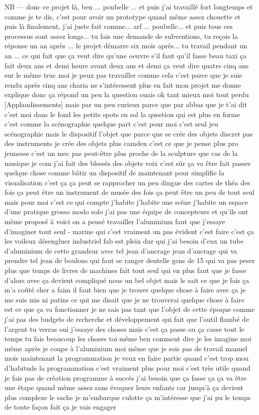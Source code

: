 NB — donc ce projet là, ben ... poubelle ... et puis j'ai travaillé fort longtemps et comme je te dis, c'est pour avoir un prototype quand même assez chouette et puis là finalement, j'ai juste fait comme... arf ... poubelle... et puis tous ces processus sont assez longs... tu fais une demande de subventions, tu reçois la réponse un an après ... le projet démarre six mois après... tu travail pendant un an ... ce qui fait que ça veut dire qu'une oeuvre s'il faut qu'il fasse beau taxi ça fait deux ans et demi heure avant deux ans et demi ça veut dire quatre cinq ans sur le même truc moi je peux pas travailler comme cela c'est parce que je suis rendu après cinq ans charia ne s'intéressent plus en fait mon projet me donne explique donc ça répond un peu la question ouais ok tant mieux moi tout perdu [Applaudissements] mais par un peu curieux parce que par abbas que je t'ai dit c'est moi dans le fond les petits spots en sol la question qui est plus en forme c'est comme la scénographie quelque part c'est pour moi c'est seul jeu scénographie mais le dispositif l'objet que parce que se crée des objets discret pas des instruments je crée des objets plus camden c'est ce que je pense plus pro jeunesse c'est un mec pas peut-être plus proche de la sculpture que cas de la musique je com j'ai fait des blessés des objets voix c'est sûr ça va être fait passer quelque chose comme bâtir un dispositif de maintenant pour simplifie la visualisation c'est ça ça peut se rapprocher un peu dingue des cartes de théa des fois ça peut être un instrument de musée des fois ça peut être un peu de tout seul mais pour moi c'est ce qui compte j'habite j'habite une scène j'habite un espace d'une pratique grosso modo solo j'ai pas une équipe de concepteurs et qu'ils ont même proposé à voici on a pensé travailler l'aluminium faut que j'essaye d'imaginer tout seul - marine qui c'est vraiment un pas évident c'est faire c'est ça les voileux désengluer industriel fab est plein dur qui j'ai besoin d'eux un tube d'aluminium de cette grandeur avec tel jean d'ancrage jean d'ancrage qui va prendre tel jean de boulons qui faut se ranger dentelle gens de 15 qui va pas peser plus que temps de livres de machines fait tout seul qui en plus faut que je fasse d'alors avec ça devient compliqué nous un bel objet mais le sait ce que je fais ça m'a coûté cher a faim il faut bien que je trouve quelque chose à faire avec ça je me suis mis ni patins ce qui me disait que je ne trouverai quelque chose à faire est ce que ça va fonctionner je ne sais pas tant que l'objet de cette époque comme j'ai pas des budgets de recherche et développement qui fait que l'outil flambé de l'argent tu verras oui j'essaye des choses mais c'est ça passe ou ça casse tout le temps tu fais beaucoup les choses toi même ben comment dire je les imagine moi même après je coupe à l'aluminium moi même que je sois pas de travail manuel mois maintenant la programmation je veux en faire partie quand c'est trop mou d'habitude la programmation c'est vraiment plus pour moi c'est très utile quand je fais pas de création programme à succès j'ai besoin que ça fasse ça ça va être une étape quand même assez sans évoquer leurs enfants car jusqu'à ça devient plus complexe le sache je m'embarque culotte ça m'intéresse que j'ai pu le temps de toute façon fait ça je vais engager 